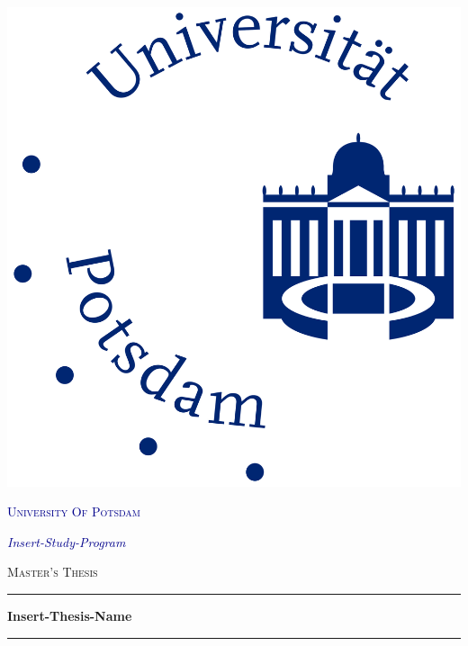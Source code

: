 \begin{titlepage}
    \begin{center}
    
    \begin{center}
      \includegraphics[scale=0.2]{uni-potsdam.jpg}
    \end{center}
    \vspace*{.008\textheight}
    {\scshape\LARGE \textcolor{darkblue}{University Of Potsdam}\par}
    
    \large 
    \textcolor{darkblue}{\emph{Insert-Study-Program}}
    
    \vspace{1.5cm}
    \textsc{\Large Master's Thesis}\\[0.5cm]
    
    \noindent\rule{\textwidth}{0.3mm}
    {\huge \bfseries Insert-Thesis-Name\par}\vspace{0.4cm}
    \noindent\rule{\textwidth}{0.3mm}
     

\end{center}
\end{titlepage}
